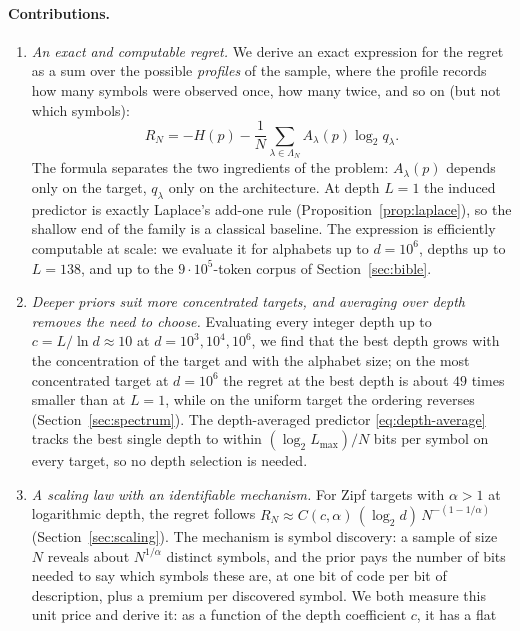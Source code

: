 \documentclass[11pt]{article}
\newcommand{\Nseq}{N}
\begin{document}
\paragraph{Contributions.}
\begin{enumerate}
\item \emph{An exact and computable regret.}  We derive an exact expression
  for the regret as a sum over the possible \emph{profiles} of the sample,
  where the profile records how many symbols were observed once, how many
  twice, and so on (but not which symbols):
  \[
    R_\Nseq
    =
    -H(p)
    -
    \frac1\Nseq\sum_{\lambda\in\Lambda_\Nseq}
    A_\lambda(p)\log_2 q_\lambda .
  \]
  The formula separates the two ingredients of the problem:
  \(A_\lambda(p)\) depends only on the target, \(q_\lambda\) only on the
  architecture.  At depth \(L=1\) the induced predictor is exactly
  Laplace's add-one rule (Proposition~\ref{prop:laplace}), so the shallow
  end of the family is a classical baseline.  The expression is efficiently
  computable at scale: we evaluate it for alphabets up to \(d=10^6\),
  depths up to \(L=138\), and up to the \(9\cdot10^5\)-token corpus of
  Section~\ref{sec:bible}.
\item \emph{Deeper priors suit more concentrated targets, and averaging
  over depth removes the need to choose.}  Evaluating every integer depth
  up to \(c=L/\ln d\approx10\) at \(d=10^3,10^4,10^6\), we find that the
  best depth grows with the concentration of the target and with the
  alphabet size; on the most concentrated target at \(d=10^6\) the regret
at the best depth is about \(49\) times smaller than at \(L=1\), while
on the uniform target the ordering reverses
(Section~\ref{sec:spectrum}). The
  depth-averaged predictor \eqref{eq:depth-average} tracks the best single
  depth to within \((\log_2 L_{\max})/\Nseq\) bits per symbol on every
  target, so no depth selection is needed.
\item \emph{A scaling law with an identifiable mechanism.}  For Zipf
  targets with \(\alpha>1\) at logarithmic depth, the regret follows
  \(R_\Nseq\approx C(c,\alpha)\,(\log_2 d)\,\Nseq^{-(1-1/\alpha)}\)
  (Section~\ref{sec:scaling}).  The mechanism is symbol discovery: a
  sample of size \(\Nseq\) reveals about \(\Nseq^{1/\alpha}\) distinct
  symbols, and the prior pays the number of bits needed to say which
  symbols these are, at one bit of code per bit of description, plus a
  premium per discovered symbol.  We both measure this unit price and
  derive it: as a function of the depth coefficient \(c\), it has a flat

\end{enumerate}
\end{document}
